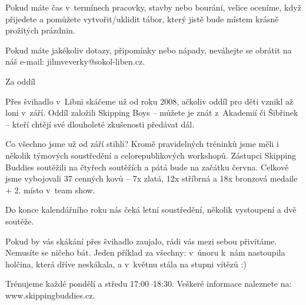\documentclass[11pt]{article}
\begin{document}
\noindent
Pokud máte čas v~termínech pracovky, stavby nebo bourání, velice oceníme, když přijedete a pomůžete vytvořit/uklidit tábor, který jistě bude místem krásně prožitých prázdnin.

Pokud máte jakékoliv dotazy, připomínky nebo nápady, neváhejte se obrátit na náš e-mail: jilmveverky@sokol-liben.cz.

\vspace*{\baselineskip}
\noindent
Za oddíl
 
\signature{Bára Jeníková}{}

\vspace*{24pt}

Přes švihadlo v~Libni skáčeme už od roku 2008, ačkoliv oddíl pro děti vznikl až loni v~září. Oddíl založili Skipping Boys – můžete je znát z~Akademií či Šibřinek – kteří chtějí své dlouholeté zkušenosti předávat dál.

Co všechno jsme už od září stihli? Kromě pravidelných tréninků jsme měli i několik týmových soustředění a celorepublikových workshopů. Zástupci Skipping Buddies soutěžili na čtyřech soutěžích a pátá bude na začátku června. Celkově jsme vybojovali 37 cenných kovů – 7x zlatá, 12x stříbrná a 18x bronzová medaile + 2. místo v~team show.

Do konce kalendářního roku nás čeká letní soustředění, několik vystoupení a dvě soutěže.

Pokud by vás skákání přes švihadlo zaujalo, rádi vás mezi sebou přivítáme. Nemusíte se ničeho bát. Jeden příklad za všechny: v~únoru k~nám nastoupila holčina, která dříve neskákala, a v~květnu stála na stupni vítězů :)

Trénujeme každé pondělí a středu 17:00–18:30. Veškeré informace naleznete na: www.skippingbuddies.cz.

\signature{Jan Dostál}
\clearpage

\end{document}
